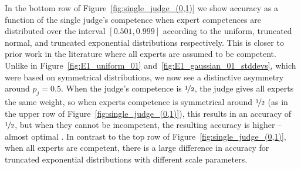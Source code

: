 \documentclass[letterpaper]{article} %
\newtheorem{conjecture}{Conjecture}
\newcommand{\judge}{\ensuremath{j} }
\newcommand{\experts}{\ensuremath{E} }
\newcommand{\omer}[1]{\textcolor{purple}{Omer says: #1}}
\newcommand{\nick}[1]{\todo[color=kentuckyblue!40,size=footnotesize]{Nick says: #1}}
\begin{document}
In the bottom row of Figure~\ref{fig:single_judge_(0,1)} we show accuracy as a function of the single judge's competence when expert competences are distributed over the interval $[0.501, 0.999]$ according to the uniform, truncated normal, and truncated exponential distributions respectively.
%
This is closer to prior work in the literature where all experts are assumed to be competent.
%
Unlike in Figure~\ref{fig:E1_uniform_01} and~\ref{fig:E1_gaussian_01_stddevs}, which were based on symmetrical distributions, we now see a distinctive asymmetry around $p_j = 0.5$. When the judge's competence is $\nicefrac{1}{2}$, the judge gives all experts the same weight, so when experts competence is symmetrical around $\nicefrac{1}{2}$ (as in the upper row of Figure~\ref{fig:single_judge_(0,1)}), 
this results in an accuracy of $\nicefrac{1}{2}$, but when they cannot be incompetent, the resulting accuracy is higher -- almost optimal \cite{baharad2022one}.
%
In contrast to the top row of Figure~\ref{fig:single_judge_(0,1)}, when all experts are competent, there is a large difference in accuracy for truncated exponential distributions with different scale parameters.
%


%
\end{document}
